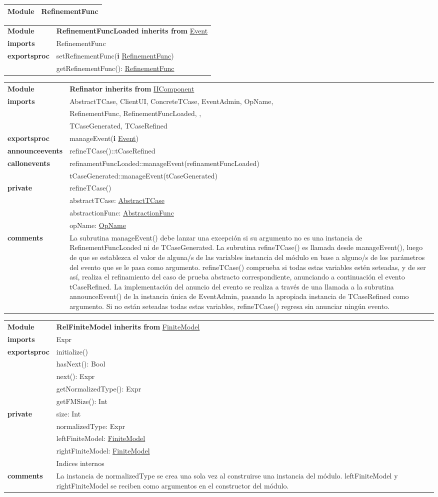 \documentclass[12pt,a4paper,fleqn]{report}
\newenvironment{module}[1]{\hypertarget{mi:#1}{} \vspace{0.5cm}\noindent\begin{tabular}{|p{0.2\textwidth} p{0.75\textwidth}|} \hline{\bf Module} & {\bf #1} \\}{\hline\end{tabular}\vspace{0.5cm}}
\newenvironment{hmodule}[2]{\hypertarget{mi:#1}{} \vspace{0.5cm}\noindent\begin{tabular}{|p{0.2\textwidth} p{0.75\textwidth}|} \hline{\bf Module} & {\bf #1 inherits from} \hyperlink{mi:#2}{#2} \\}{\hline\end{tabular}\vspace{0.5cm}}
\newcommand{\eproc}{{\bf exportsproc}}
\newcommand{\annev}{{\bf announceevents}}
\newcommand{\callonev}{{\bf callonevents}}
\newcommand{\priv}{{\bf private}}
\newcommand{\proc}[1]{& #1 \\}
\newcommand{\e}[1]{{\bf i} \hyperlink{mi:#1}{#1}}
\newcommand{\imp}[1]{{\bf imports} & #1 \\}
\newcommand{\comm}[1]{{\bf comments} & #1 \\}
\newcommand{\mdr}[1]{\hyperlink{mi:#1}{#1}}
\newcommand{\extraline}[1]{& #1 \\}
\begin{document}
\begin{module}{RefinementFunc} 
\end{module}


\begin{hmodule}{RefinementFuncLoaded}{Event}
\imp{RefinementFunc}
\eproc
\proc{setRefinementFunc(\e {RefinementFunc})}
\proc{getRefinementFunc(): \mdr{RefinementFunc}}
\end{hmodule}


\begin{hmodule}{Refinator}{IIComponent}
\imp{AbstractTCase, ClientUI, ConcreteTCase, EventAdmin, OpName, }
\extraline{RefinementFunc, RefinementFuncLoaded, ,}
\extraline{TCaseGenerated, TCaseRefined}
\eproc
\proc{manageEvent(\e {Event})}
\annev
\proc{refineTCase()::tCaseRefined}
\callonev
\proc{refinamentFuncLoaded::manageEvent(refinamentFuncLoaded)}
\proc{tCaseGenerated::manageEvent(tCaseGenerated)}
\priv
\proc{refineTCase()}
\proc{abstractTCase: \mdr{AbstractTCase}}
\proc{abstractionFunc: \mdr{AbstractionFunc}}
\proc{opName: \mdr{OpName}}
\comm{La subrutina manageEvent() debe lanzar una excepción si su argumento no es una instancia de RefinementFuncLoaded ni de TCaseGenerated. La subrutina refineTCase() es llamada desde manageEvent(), luego de que se establezca el valor de alguna/s de las variables instancia del módulo en base a alguno/s de los parámetros del evento que se le pasa como argumento. refineTCase() comprueba si todas estas variables estén seteadas, y de ser así, realiza el refinamiento del caso de prueba abstracto correspondiente, anunciando a continuación el evento tCaseRefined. La implementación del anuncio del evento se realiza a través de una llamada a la subrutina announceEvent() de la instancia única de EventAdmin, pasando la apropiada instancia de TCaseRefined como argumento. Si no están seteadas todas estas variables, refineTCase() regresa sin anunciar ningún evento.}
\end{hmodule}	


\begin{hmodule}{RelFiniteModel}{FiniteModel}
\imp{Expr}
\eproc
\proc{initialize()}
\proc{hasNext(): Bool}
\proc{next(): Expr}
\proc{getNormalizedType(): Expr}
\proc{getFMSize(): Int}
\priv
\proc{size: Int}
\proc{normalizedType: Expr}
\proc{leftFiniteModel: \mdr{FiniteModel}}
\proc{rightFiniteModel: \mdr{FiniteModel}}
\proc{Indices internos}
\comm{La instancia de normalizedType se crea una sola vez al construirse una instancia del módulo. leftFiniteModel y rightFiniteModel se reciben como argumentos en el constructor del módulo. }
\end{hmodule}
\end{document}

